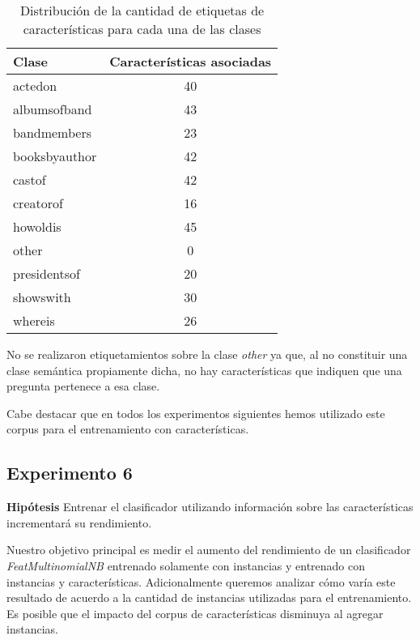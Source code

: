 \begin{table}[h]\label{dist-feat-corpus}
\centering
\begin{tabular}{l c}
    Clase & Características asociadas\\ [0.5ex]
    \hline
    actedon & 40 \\ [0.5ex]
    albumsofband & 43 \\ [0.5ex]
    bandmembers &  23 \\ [0.5ex]
    booksbyauthor &  42 \\ [0.5ex]
    castof & 42 \\ [0.5ex]
    creatorof & 16 \\ [0.5ex]
    howoldis & 45 \\ [0.5ex]
    other & 0 \\ [0.5ex]
    presidentsof & 20 \\ [0.5ex]
    showswith & 30 \\ [0.5ex]
    whereis & 26 \\ [0.5ex]
    \hline
\end{tabular}
\caption{Distribución de la cantidad de etiquetas de características para cada una de las clases}
\end{table}

No se realizaron etiquetamientos sobre la clase \textit{other} ya que, al no constituir una clase semántica propiamente dicha, no hay características que indiquen que una pregunta pertenece a esa clase.

Cabe destacar que en todos los experimentos siguientes hemos utilizado este corpus para el entrenamiento con características.

\subsection{Experimento 6}
\vspace{3 mm}
\textbf{Hipótesis} Entrenar el clasificador utilizando información sobre las características incrementará su rendimiento.
\vspace{3 mm}

Nuestro objetivo principal es medir el aumento del rendimiento de un clasificador \textit{FeatMultinomialNB} entrenado solamente con instancias y entrenado con instancias y características. Adicionalmente queremos analizar cómo varía este resultado de acuerdo a la cantidad de instancias utilizadas para el entrenamiento. Es posible que el impacto del corpus de características disminuya al agregar instancias.

